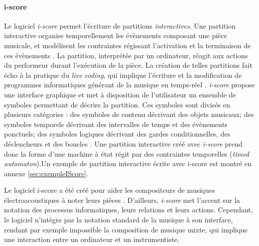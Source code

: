 \paragraph{i-score} Le logiciel \textit{i-score} permet l'écriture de partitions \textit{interactives}. Une partition interactive organise temporellement les évènements composant une pièce musicale, et modélisent les contraintes régissant l'activation et la terminaison de ces évènements \cite{arias2017}.
La partition, interprétée par un ordinateur, réagit aux actions du performeur durant l'exécution de la pièce.     
La création de telles partitions fait écho à la pratique du \textit{live coding}, qui \og implique l'écriture et la modification de programmes informatiques générant de la musique en temps-réel \fg \cite{sorensen2009}.
\textit{i-score} propose une interface graphique et met à disposition de l'utilisateur un ensemble de symboles permettant de décrire la partition. Ces symboles sont divisés en plusieurs catégories : des symboles de contenu décrivant des objets musicaux; des symboles temporels décrivant des intervalles de temps et des évènements ponctuels; des symboles logiques décrivant des gardes conditionnelles, des déclencheurs et des boucles \cite{delahogue2016}.   
Une partition interactive créé avec \textit{i-score} prend donc la forme d'une machine à état régit par des contraintes temporelles (\textit{timed automaton}).Un exemple de partition interactive écrite avec i-score est montré en annexe \ref{sec:exempleIScore}.
 
Le logiciel i-score a été créé pour aider les compositeurs de musiques électroacoustiques à noter leurs pièces \cite{assayag2008}. D'ailleurs, \textit{i-score} met l'accent sur la notation des processus informatiques, leurs relations et leurs actions. Cependant, le logiciel n'intègre pas la notation standard de la musique à son interface, rendant par exemple impossible la composition de musique mixte, qui implique une interaction entre un ordinateur et un instrumentiste.   
